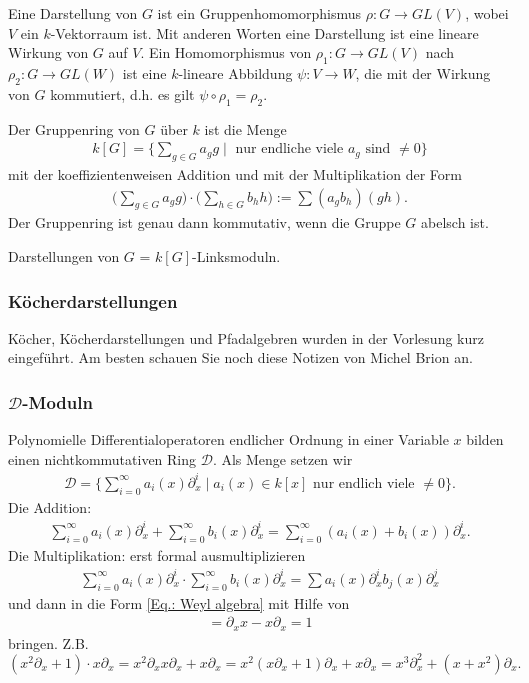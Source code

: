\documentclass[reqno,12pt]{article}
\numberwithin{equation}{section}
\newcommand{\cD}{\mathcal{D}}
\theoremstyle{plain}
\theoremstyle{definition}
\begin{document}
Eine {\sf Darstellung} von $G$ ist ein Gruppenhomomorphismus $\rho \colon G \to GL(V)$, wobei $V$ ein $k$-Vektorraum ist. Mit anderen Worten eine Darstellung ist eine lineare Wirkung von $G$ auf $V$. Ein Homomorphismus von $\rho_1 \colon G \to GL(V)$ nach $\rho_2 \colon G \to GL(W)$ ist eine $k$-lineare Abbildung $\psi \colon V \to W$, die mit der Wirkung von $G$ kommutiert, d.h. es gilt $\psi \circ \rho_1 = \rho_2$.

Der {\sf Gruppenring} von $G$ über $k$ ist die Menge
\begin{align*}
  k[G]  =  \Big \{ \sum_{g \in G} a_g g \mid \text{ nur endliche viele $a_g$ sind $\neq 0$} \Big \}
\end{align*}
mit der koeffizientenweisen Addition und mit der Multiplikation der Form
\begin{align*}
  \big( \sum_{g \in G} a_g g \big) \cdot \big( \sum_{h \in G} b_h h \big) := \sum (a_g b_h) (gh).
\end{align*}
Der Gruppenring ist genau dann kommutativ, wenn die Gruppe $G$ abelsch ist.

\medskip

\noindent Darstellungen von $G$ = $k[G]$-Linksmoduln.


\subsubsection{Köcherdarstellungen}

Köcher, Köcherdarstellungen und Pfadalgebren wurden in der Vorlesung kurz eingeführt. Am besten schauen Sie noch diese Notizen von Michel Brion an.

\subsubsection{$\cD$-Moduln}

Polynomielle Differentialoperatoren endlicher Ordnung in einer Variable $x$ bilden einen nichtkommutativen Ring $\cD$. Als Menge setzen wir
\begin{align}\label{Eq.: Weyl algebra}
\cD = \Big \{ \sum_{i=0}^\infty a_i(x) \partial_x^i  \mid a_i(x) \in k[x] \text{ nur endlich viele $\neq 0$} \Big \}.
\end{align}
Die Addition:
\begin{align*}
\sum_{i=0}^\infty a_i(x) \partial_x^i + \sum_{i=0}^\infty b_i(x) \partial_x^i   = \sum_{i=0}^\infty (a_i(x) + b_i(x)) \partial_x^i.
\end{align*}
Die Multiplikation: erst formal ausmultiplizieren
\begin{align*}
\sum_{i=0}^\infty a_i(x) \partial_x^i \cdot \sum_{i=0}^\infty b_i(x) \partial_x^i = \sum a_i(x) \partial_x^i b_j(x) \partial_x^j
\end{align*}
und dann in die Form \eqref{Eq.: Weyl algebra} mit Hilfe von
\begin{align*}
[\partial_x, x] = \partial_x x - x \partial_x = 1
\end{align*}
bringen. Z.B.
$$
(x^2\partial_x + 1) \cdot x\partial_x = x^2 \partial_x x \partial_x + x\partial_x = x^2 (x \partial_x + 1) \partial_x + x\partial_x =x^3 \partial_x^2  + (x+x^2)\partial_x.
$$
\end{document}
